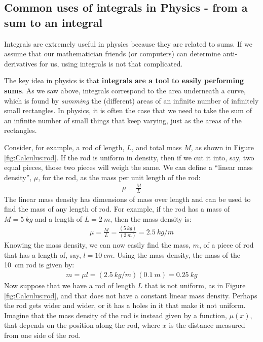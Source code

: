 \subsection{Common uses of integrals in Physics - from a sum to an integral}
Integrals are extremely useful in physics because they are related to sums. If we assume that our mathematician friends (or computers) can determine anti-derivatives for us, using integrals is not that complicated. 

The key idea in physics is that \textbf{integrals are a tool to easily performing sums}. As we saw above, integrals correspond to the area underneath a curve, which is found by \textit{summing} the (different) areas of an infinite number of infinitely small rectangles. In physics, it is often the case that we need to take the sum of an infinite number of small things that keep varying, just as the areas of the rectangles. 

Consider, for example, a rod of length, $L$, and total mass $M$, as shown in Figure \ref{fig:Calculus:rod}. If the rod is uniform in density, then if we cut it into, say, two equal pieces, those two pieces will weigh the same. We can define a ``linear mass density'', $\mu$, for the rod, as the mass per unit length of the rod:
\begin{align*}
\mu = \frac{M}{L}
\end{align*} 
The linear mass density has dimensions of mass over length and can be used to find the mass of any length of rod. For example, if the rod has a mass of $M=\SI{5}{kg}$ and a length of $L=\SI{2}{m}$, then the mass density is:
\begin{align*}
\mu=\frac{M}{L}=\frac{(\SI{5}{kg})}{(\SI{2}{m})}=\SI{2.5}{kg/m}
\end{align*}
Knowing the mass density, we can now easily find the mass, $m$, of a piece of rod that has a length of, say, $l=\SI{10}{cm}$. Using the mass density, the mass of the \SI{10}{cm} rod is given by:
\begin{align*}
m=\mu l=(\SI{2.5}{kg/m})(\SI{0.1}{m})=\SI{0.25}{kg}
\end{align*}
Now suppose that we have a rod of length $L$ that is not uniform, as in Figure \ref{fig:Calculus:rod}, and that does not have a constant linear mass density. Perhaps the rod gets wider and wider, or it has a holes in it that make it not uniform. Imagine that the mass density of the rod is instead given by a function, $\mu(x)$, that depends on the position along the rod, where $x$ is the distance measured from one side of the rod. 

